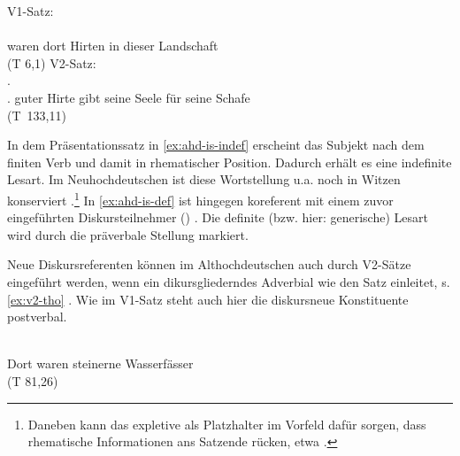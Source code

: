 \begin{exe}
	\ex \label{ex:ahd-is}   
	\begin{xlist}
		\ex \label{ex:ahd-is-indef} V1-Satz:\\
		\gll {}        \\
		waren dort Hirten in dieser Landschaft\\
	\trans {} 
	(T 6,1)
	\ex \label{ex:ahd-is-def} V2-Satz:\\
		.         \\
		[Ich bin guter Hirte]. guter Hirte gibt seine Seele für seine Schafe\\
	\trans {} (T~133,11)

		\end{xlist}
\end{exe}

\noindent
In dem Präsentationssatz in \ref{ex:ahd-is-indef} erscheint das Subjekt  nach dem finiten Verb  und damit in rhematischer Position. Dadurch erhält es eine indefinite Lesart. Im Neuhochdeutschen ist diese Wortstellung u.a. noch in Witzen konserviert \parencite[, vgl.][83]{Ramers2005}.\footnote{Daneben kann das expletive  als Platzhalter im Vorfeld dafür sorgen, dass rhematische Informationen ans Satzende rücken, etwa  \parencite[s. z.B.][]{Hauenschild1993}.} In \ref{ex:ahd-is-def} ist  hingegen koreferent mit einem zuvor eingeführten Diskursteilnehmer () \parencite[vgl. auch][]{Solf2008}. Die definite (bzw. hier: generische) Lesart wird durch die präverbale Stellung markiert.  

Neue Diskursreferenten können im Althochdeutschen auch durch V2-Sätze eingeführt werden, wenn ein dikursgliederndes Adverbial wie    den Satz einleitet, s. \ref{ex:v2-tho} \parencite[vgl.][152]{Hinterholzl2005}. Wie im V1-Satz steht auch hier die diskursneue Konstituente postverbal. 

\begin{exe} 
\ex \label{ex:v2-tho} 
\gll {}    \\
	Dort waren steinerne Wasserfässer \\
	\trans {} (T 81,26)
\end{exe}

